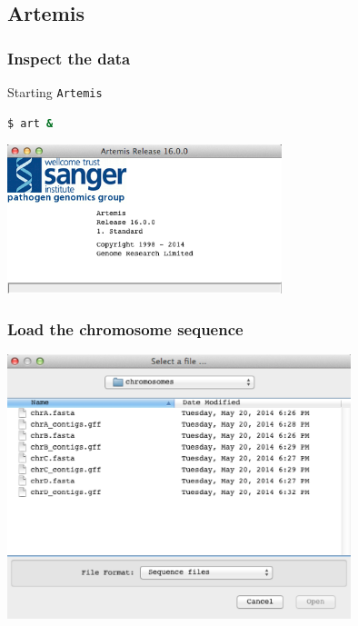 \documentclass[table]{beamer}
\begin{document}
  \subsection{Artemis}
  \begin{frame}[fragile]
    \frametitle{Inspect the data}
    Starting \texttt{Artemis}
\begin{lstlisting}[language=bash]
$ art &
\end{lstlisting}
    \begin{center}
      \includegraphics[width=0.6\textwidth]{images/artemis_splash} 
    \end{center}
\end{frame}
    
  \begin{frame}
    \frametitle{Load the chromosome sequence}
    \begin{center}
      \includegraphics[width=0.75\textwidth]{images/artemis_files} 
    \end{center}
\end{frame}
    
\end{document}
